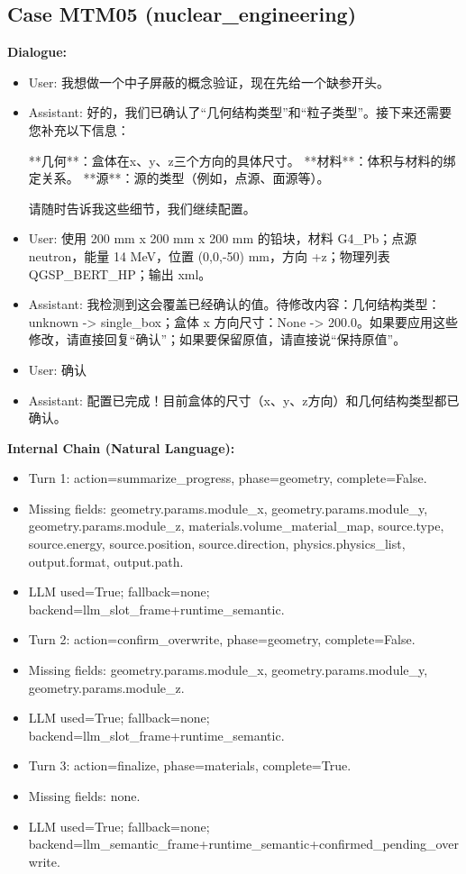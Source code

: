 \documentclass[11pt]{ctexart}
\begin{document}
\subsection{Case MTM05 (nuclear\_engineering)}
\textbf{Dialogue:}
\begin{itemize}
\item User: 我想做一个中子屏蔽的概念验证，现在先给一个缺参开头。
\item Assistant: 好的，我们已确认了“几何结构类型”和“粒子类型”。接下来还需要您补充以下信息：

**几何**：盒体在x、y、z三个方向的具体尺寸。
**材料**：体积与材料的绑定关系。
**源**：源的类型（例如，点源、面源等）。

请随时告诉我这些细节，我们继续配置。
\item User: 使用 200 mm x 200 mm x 200 mm 的铅块，材料 G4\_Pb；点源 neutron，能量 14 MeV，位置 (0,0,-50) mm，方向 +z；物理列表 QGSP\_BERT\_HP；输出 xml。
\item Assistant: 我检测到这会覆盖已经确认的值。待修改内容：几何结构类型：unknown -> single\_box；盒体 x 方向尺寸：None -> 200.0。如果要应用这些修改，请直接回复“确认”；如果要保留原值，请直接说“保持原值”。
\item User: 确认
\item Assistant: 配置已完成！目前盒体的尺寸（x、y、z方向）和几何结构类型都已确认。
\end{itemize}
\textbf{Internal Chain (Natural Language):}
\begin{itemize}
\item Turn 1: action=summarize\_progress, phase=geometry, complete=False.
\item Missing fields: geometry.params.module\_x, geometry.params.module\_y, geometry.params.module\_z, materials.volume\_material\_map, source.type, source.energy, source.position, source.direction, physics.physics\_list, output.format, output.path.
\item LLM used=True; fallback=none; backend=llm\_slot\_frame+runtime\_semantic.
\item Turn 2: action=confirm\_overwrite, phase=geometry, complete=False.
\item Missing fields: geometry.params.module\_x, geometry.params.module\_y, geometry.params.module\_z.
\item LLM used=True; fallback=none; backend=llm\_slot\_frame+runtime\_semantic.
\item Turn 3: action=finalize, phase=materials, complete=True.
\item Missing fields: none.
\item LLM used=True; fallback=none; backend=llm\_semantic\_frame+runtime\_semantic+confirmed\_pending\_overwrite.
\end{itemize}
\end{document}
